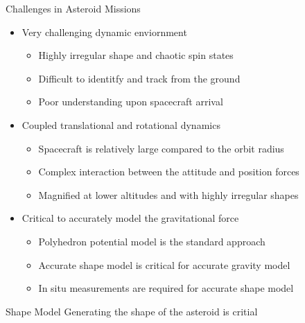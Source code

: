 \documentclass[11pt,professionalfonts]{beamer}
\begin{document}
\begin{frame}{Challenges in Asteroid Missions}
    \begin{itemize}
        \item Very challenging dynamic enviornment
            \begin{itemize}
                \item Highly irregular shape and chaotic spin states
                \item Difficult to identitfy and track from the ground
                \item Poor understanding upon spacecraft arrival
            \end{itemize}
        \item Coupled translational and rotational dynamics
            \begin{itemize}
                \item Spacecraft is relatively large compared to the orbit radius
                \item Complex interaction between the attitude and position forces
                \item Magnified at lower altitudes and with highly irregular shapes
            \end{itemize}
        \item Critical to accurately model the gravitational force
            \begin{itemize}
                \item Polyhedron potential model is the standard approach 
                \item Accurate shape model is critical for accurate gravity model
                \item In situ measurements are required for accurate shape model
            \end{itemize}
    \end{itemize}

    \begin{block}{ Shape Model }
        Generating the shape of the asteroid is critial
    \end{block}
\end{frame}
\end{document}
